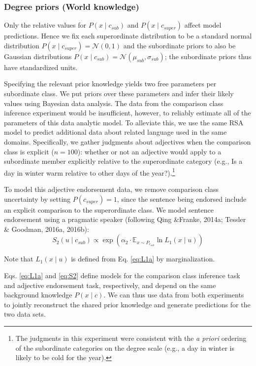 \documentclass[doc]{apa6}
\begin{document}
\subsubsection{Degree priors (World knowledge)}

Only the relative values for \(P(x \mid c_{sub})\) and \(P(x \mid c_{super})\) affect model predictions. 
Hence we fix each superordinate distribution to be a standard normal distribution \(P(x \mid c_{super}) = \mathcal{N}(0, 1)\) and the subordinate priors to also be Gaussian distributions \(P(x \mid c_{sub}) = \mathcal{N}(\mu_{sub}, \sigma_{sub})\); the subordinate priors thus have standardized units.

Specifying the relevant prior knowledge yields two free parameters per subordinate class. We put priors over these parameters and infer their likely values using Bayesian data analysis. The data from the comparison class inference experiment would be insufficient, however, to reliably estimate all of the parameters of this data analytic model. To alleviate this, we use the same RSA model to predict additional data about related language used in the same domains. Specifically, we gather judgments about adjectives when the comparison class is explicit (\(n = 100\)): whether or not an adjective would apply to a subordinate member explicitly relative to the superordinate category (e.g., Is a day in winter warm relative to other days of the year?).\footnote{The judgments in this experiment were consistent with the \emph{a priori} ordering of the subordinate categories on the degree scale (e.g., a day in winter is likely to be cold for the year).}

To model this adjective endorsement data, we remove comparison class uncertainty by setting \(P(c_{super}) = 1\), since the sentence being endorsed include an explicit comparison to the superordinate class. We model sentence endorsement using a pragmatic speaker (following Qing \&Franke, 2014a; Tessler \& Goodman, 2016a, 2016b): \vspace{-0.5cm}
\begin{equation}
S_{2}(u \mid c_{sub}) \propto \exp{(\alpha_2 \cdot {\mathbb E}_{x\sim P_{c_{sub}}} \ln{L_1(x \mid u)})} \label{eq:S2a}
\end{equation} 

\noindent Note that $L_1(x \mid u)$ is defined from Eq. \ref{eq:L1a} by marginalization.

Eqs. \ref{eq:L1a} and \ref{eq:S2} define models for the comparison class inference task and adjective endorsement task, respectively, and depend on the same background knowledge \(P(x\mid c)\). We can thus use data from both experiments to jointly reconstruct the shared prior knowledge and generate predictions for the two data sets.
\end{document}
